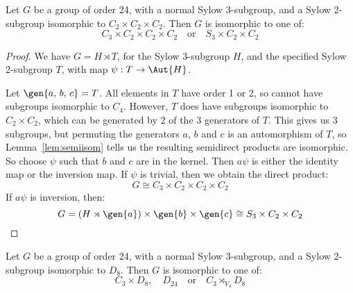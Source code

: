 \begin{lemma}
    Let \(G\) be a group of order 24, with a normal Sylow 3-subgroup, and a Sylow 2-subgroup isomorphic to \(C_2 \times
    C_2 \times C_2\).
    Then \(G\) is isomorphic to one of:
    \[
        C_3 \times C_2 \times C_2 \times C_2 \quad \text{or} \quad%
        S_3 \times C_2 \times C_2
    \]
\end{lemma}

\begin{proof}
    We have \(G = H \rtimes T\), for the Sylow 3-subgroup \(H\), and the specified Sylow 2-subgroup \(T\), with map
    \(\psi:T \to \Aut{H}\).

    Let \(\gen{a,\,b,\,c} = T\).
    All elements in \(T\) have order 1 or 2, so cannot have subgroups isomorphic to \(C_4\).
    However, \(T\) does have subgroups isomorphic to \(C_2 \times C_2\), which can be generated by 2 of the 3
    generators of \(T\).
    This gives us 3 subgroups, but permuting the generators \(a,\,b\) and \(c\) is an automorphism of \(T\), so
    Lemma~\ref{lem:semiisom} tells us the resulting semidirect products are isomorphic.
    So choose \(\psi\) such that \(b\) and \(c\) are in the kernel.
    Then \(a\psi\) is either the identity map or the inversion map.
    If \(\psi\) is trivial, then we obtain the direct product:
    \[G \cong C_3 \times C_2 \times C_2 \times C_2\]
    If \(a\psi\) is inversion, then:
    \[G = (H \rtimes \gen{a}) \times \gen{b} \times \gen{c} \cong S_3 \times C_2 \times C_2\]
\end{proof}


\begin{lemma}
    Let \(G\) be a group of order 24, with a normal Sylow 3-subgroup, and a Sylow 2-subgroup isomorphic to \(D_8\).
    Then \(G\) is isomorphic to one of:
    \[
        C_3 \times D_8, \quad%
        D_{24} \quad \text{or} \quad%
        C_3 \rtimes_{V_4} D_8
    \]
\end{lemma}

